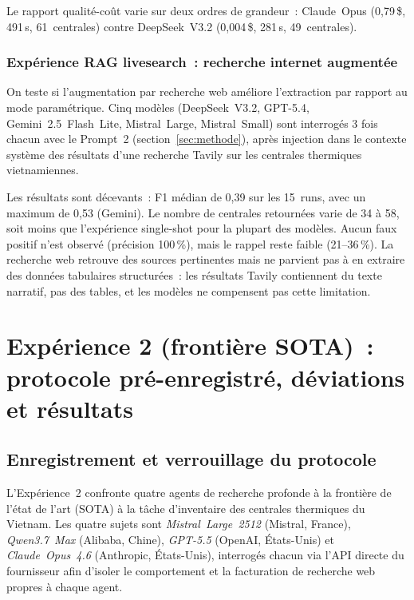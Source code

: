 \documentclass[a4paper,11pt]{report}
\begin{document}
Le rapport qualité-coût varie sur deux ordres de grandeur~: Claude~Opus (0,79\,\$, 491\,s, 61~centrales) contre DeepSeek~V3.2 (0,004\,\$, 281\,s, 49~centrales).

\subsection{Expérience RAG livesearch~: recherche internet augmentée}\label{sec:rag_livesearch}

On teste si l'augmentation par recherche web améliore l'extraction par rapport au mode paramétrique. Cinq modèles (DeepSeek~V3.2, GPT-5.4, Gemini~2.5~Flash~Lite, Mistral~Large, Mistral~Small) sont interrogés 3 fois chacun avec le Prompt~2 (section~\ref{sec:methode}), après injection dans le contexte système des résultats d'une recherche Tavily sur les centrales thermiques vietnamiennes.

Les résultats sont décevants~: F1 médian de 0,39 sur les 15~runs, avec un maximum de 0,53 (Gemini). Le nombre de centrales retournées varie de 34 à 58, soit moins que l'expérience single-shot pour la plupart des modèles. Aucun faux positif n'est observé (précision 100\,\%), mais le rappel reste faible (21--36\,\%). La recherche web retrouve des sources pertinentes mais ne parvient pas à en extraire des données tabulaires structurées~: les résultats Tavily contiennent du texte narratif, pas des tables, et les modèles ne compensent pas cette limitation.

\chapter{Expérience 2 (frontière SOTA)~: protocole pré-enregistré, déviations et résultats}\label{chap:exp2-sota}

\section{Enregistrement et verrouillage du protocole}\label{sec:exp2-sota:protocole}

L'Expérience~2 confronte quatre agents de recherche profonde à la frontière de l'état de l'art (SOTA) à la tâche d'inventaire des centrales thermiques du Vietnam. Les quatre sujets sont \emph{Mistral~Large~2512} (Mistral, France), \emph{Qwen3.7~Max} (Alibaba, Chine), \emph{GPT-5.5} (OpenAI, États-Unis) et \emph{Claude~Opus~4.6} (Anthropic, États-Unis), interrogés chacun via l'API directe du fournisseur afin d'isoler le comportement et la facturation de recherche web propres à chaque agent.
\end{document}
